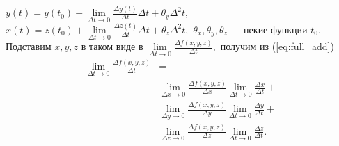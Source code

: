 $y(t) = y(t_0) + \lim \limits_{\Delta t \to 0} \frac {\Delta y (t)} {\Delta t} \Delta t + \theta_y \Delta^2 t ,$
$x(t) = z(t_0) + \lim \limits_{\Delta t \to 0} \frac {\Delta z (t)} {\Delta t} \Delta t + \theta_z \Delta^2 t ,$
$\theta_x, \theta_y, \theta_z$ --- некие функции $t_0.$
Подставим $x, y, z$ 
 в таком виде в 
$\lim\limits_{\Delta t \to 0} \frac{\Delta f(x,y,z)}{\Delta t},$
получим из (\ref{eq:full_add})
\begin{equation}
\label{eq:complex_diff}
\begin{split}
\lim\limits_{\Delta t \to 0} \frac{\Delta f(x,y,z)}{\Delta t} &=\\ 
&\lim\limits_{\Delta x \to 0} \frac{\Delta f(x,y,z)}{\Delta x} 
\lim\limits_{\Delta t \to 0} \frac{\Delta x}{\Delta t}+ \\
&\lim\limits_{\Delta y \to 0} \frac{\Delta f(x,y,z)}{\Delta y} 
\lim\limits_{\Delta t \to 0} \frac{\Delta y}{\Delta t}+ \\
&\lim\limits_{\Delta z \to 0} \frac{\Delta f(x,y,z)}{\Delta z} 
\lim\limits_{\Delta t \to 0} \frac{\Delta z}{\Delta t}.
\end{split}
\end{equation}
